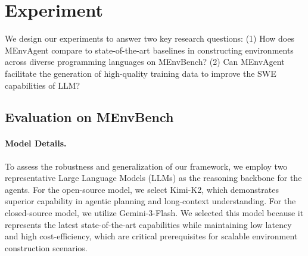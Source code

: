 \documentclass{article}
\theoremstyle{plain}
\theoremstyle{definition}
\theoremstyle{remark}
\begin{document}
\section{Experiment}
We design our experiments to answer two key research questions: 
(1) How does MEnvAgent compare to state-of-the-art baselines in constructing environments across diverse programming languages on MEnvBench? 
(2) Can MEnvAgent facilitate the generation of high-quality training data to improve the SWE capabilities of LLM?
\subsection{Evaluation on MEnvBench}
\paragraph{Model Details.}
To assess the robustness and generalization of our framework, we employ two representative Large Language Models (LLMs) as the reasoning backbone for the agents. 
For the open-source model, we select Kimi-K2, which demonstrates superior capability in agentic planning and long-context understanding. 
For the closed-source model, we utilize Gemini-3-Flash. We selected this model because it represents the latest state-of-the-art capabilities while maintaining low latency and high cost-efficiency, which are critical prerequisites for scalable environment construction scenarios.
\end{document}
